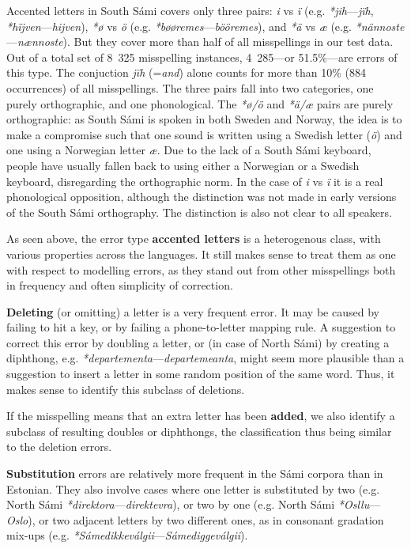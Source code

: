 \documentclass{flammie}
\begin{document}
Accented letters in South Sámi covers only three pairs: \textit{i} vs \textit{ï}
(e.g. \textit{*jih}---\textit{jïh}, \textit{*hïjven}---\textit{hijven}),
\textit{*ø} vs \textit{ö} (e.g. \textit{*bøøremes}---\textit{bööremes}), and
\textit{*ä} vs \textit{æ} (e.g. \textit{*nännoste}---\textit{nænnoste}). But
they cover more than half of all misspellings in our test data. Out of a total
set of 8~325 misspelling instances, 4~285---or 51.5\%---are errors of this
type. The conjuction \textit{jïh} (=\textit{and}) alone counts for more than
10\% (884 occurrences) of all misspellings. The three pairs fall into two
categories, one purely orthographic, and one phonological. The \textit{*ø/ö} and
\textit{*ä/æ} pairs are purely orthographic: as South Sámi is spoken in both
Sweden and Norway, the idea is to make a compromise such that one sound is
written using a Swedish letter (\textit{ö}) and one using a Norwegian letter
\textit{æ}. Due to the lack of a South Sámi keyboard, people have usually fallen
back to using either a Norwegian or a Swedish keyboard, disregarding the
orthographic norm. In the case of \textit{i} vs \textit{ï} it is a real
phonological opposition, although the distinction was not made in early versions
of the South Sámi orthography. The distinction is also not clear to all
speakers.

As seen above, the error type \textbf{accented letters} is a heterogenous class,
with various properties across the languages. It still makes sense to treat them
as one with respect to modelling errors, as they stand out from other
misspellings both in frequency and often simplicity of correction.

\textbf{Deleting} (or omitting) a letter is a very frequent error. It may be
caused by failing to hit a key, or by failing a phone-to-letter mapping rule. A
suggestion to correct this error by doubling a letter, or (in case of North
Sámi) by creating a diphthong, e.g.
\textit{*departementa}---\textit{departemeanta}, might seem more plausible than
a suggestion to insert a letter in some random position of the same word. Thus,
it makes sense to identify this subclass of deletions.

If the misspelling means that an extra letter has been \textbf{added}, we also
identify a subclass of resulting doubles or diphthongs, the classification thus
being similar to the deletion errors.

\textbf{Substitution} errors are relatively more frequent in the Sámi corpora
than in Estonian. They also involve cases where one letter is substituted by two
(e.g. North Sámi \textit{*direktora}---\textit{direktevra}), or two by one (e.g.
North Sámi \textit{*Osllu}---\textit{Oslo}), or two adjacent letters by two
different ones, as in consonant gradation mix-ups (e.g.
\textit{*Sámedikkeválgii}---\textit{Sámediggeválgii}).
\end{document}
